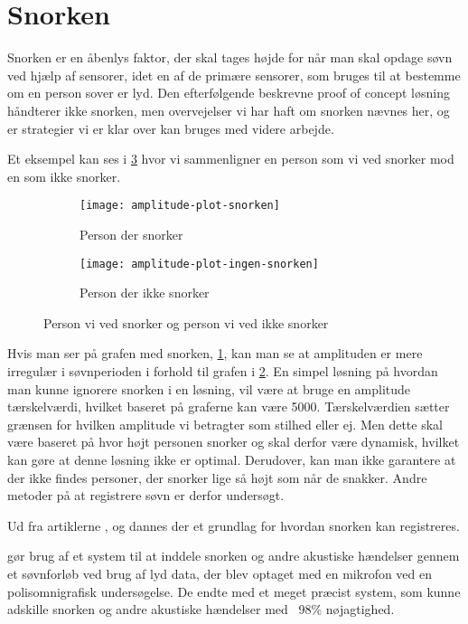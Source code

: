 \section{Snorken}\label{section:snorken}
Snorken er en åbenlys faktor, der skal tages højde for når man skal opdage søvn ved hjælp af sensorer, idet en af de primære sensorer, som bruges til at bestemme om en person sover er lyd.
Den efterfølgende beskrevne proof of concept løsning håndterer ikke snorken, men overvejelser vi har haft om snorken nævnes her, og er strategier vi er klar over kan bruges med videre arbejde.

Et eksempel kan ses i \cref{fig:snorke-vs-ikkesnorken} hvor vi sammenligner en person som vi ved snorker mod en som ikke snorker.

\begin{figure}[h]
\begin{subfigure}{0.49\textwidth}
\texttt{[image: amplitude-plot-snorken]}
\caption{Person der snorker}
\label{fig:person-snorker}
\end{subfigure}
\begin{subfigure}{0.49\textwidth}
\texttt{[image: amplitude-plot-ingen-snorken]}
\caption{Person der ikke snorker}
\label{fig:person-ikke-snorker}
\end{subfigure}
\caption{Person vi ved snorker og person vi ved ikke snorker}
\label{fig:snorke-vs-ikkesnorken}
\end{figure}

Hvis man ser på grafen med snorken, \cref{fig:person-snorker}, kan man se at amplituden er mere irregulær i søvnperioden i forhold til grafen i \cref{fig:person-ikke-snorker}.
En simpel løsning på hvordan man kunne ignorere snorken i en løsning, vil være at bruge en amplitude tærskelværdi, hvilket baseret på graferne kan være 5000. 
Tærskelværdien sætter grænsen for hvilken amplitude vi betragter som stilhed eller ej.
Men dette skal være baseret på hvor højt personen snorker og skal derfor være dynamisk, hvilket kan gøre at denne løsning ikke er optimal. 
Derudover, kan man ikke garantere at der ikke findes personer, der snorker lige så højt som når de snakker.
Andre metoder på at registrere søvn er derfor undersøgt.

Ud fra artiklerne \citet{Dafna2013}, \citet{Calabrese20111101} og \citet{7051338} dannes der et grundlag for hvordan snorken kan registreres.

\citet{Dafna2013} gør brug af et system til at inddele snorken og andre akustiske hændelser gennem et søvnforløb ved brug af lyd data, der blev optaget med en mikrofon ved en polisomnigrafisk undersøgelse. 
De endte med et meget præcist system, som kunne adskille snorken og andre akustiske hændelser med ~98\% nøjagtighed.

